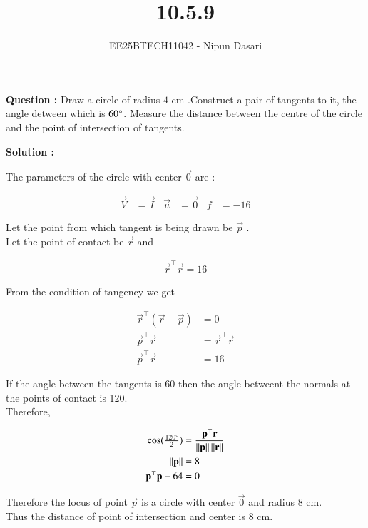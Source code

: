 \documentclass[journal,12pt,onecolumn]{IEEEtran}
\begin{document}
	
	\title{10.5.9}
	\author{EE25BTECH11042 - Nipun Dasari}
	\maketitle
	\renewcommand{\thefigure}{\theenumi}
	\renewcommand{\thetable}{\theenumi}
	
	
	\textbf{Question :} Draw a circle of radius $4$ cm .Construct a pair of tangents to it, the angle detween
	which is $60\degree$. Measure the distance between the centre
	of the circle and the point of intersection of tangents.
	
	
	\textbf{Solution :}
	
	
	
	The parameters of the circle with center $\vec{0}$ are :
	
	\begin{align}
		\vec{V} &= \vec{I} & \vec{u} &= \vec{0} & f &= -16
	\end{align}
	
	Let the point from which tangent is being drawn be $\vec{p}$ .\\
	
	Let the point of contact be $\vec{r}$ and 
	
	\begin{align}
		\vec{r}^\top\vec{r} = 16 
	\end{align}
	
	From the condition of tangency we get 
	
	\begin{align}
		\vec{r}^\top(\vec{r}-\vec{p}) &= 0\\
		\vec{p}^\top\vec{r} &= \vec{r}^\top\vec{r}\\
		\vec{p}^\top\vec{r} &= 16 \label{eq:pr} 
	\end{align}
	
	If the angle between the tangents is 60{\degree} then the angle betweent the normals at the points of contact is 120{\degree}.\\
	
	Therefore,
	
	\begin{align}
		\cos(\tfrac{120\degree}{2}) &= \frac{\mathbf{p}^\top\mathbf{r}}{\left\lVert\mathbf{p}\right\rVert\left\lVert\mathbf{r}\right\rVert}\\
		\left\lVert\mathbf{p}\right\rVert &= 8\\
		\mathbf{p}^\top\mathbf{p} - 64 &= 0
	\end{align}
	
	Therefore the locus of point $\vec{p}$ is a circle with center $\vec{0}$ and radius 8 cm.\\
	Thus the distance of point of intersection and center is 8 cm.
	
\end{document}

